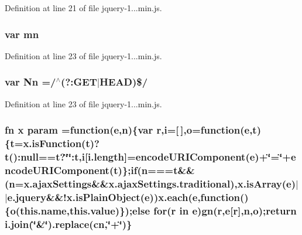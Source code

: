 Definition at line 21 of file jquery-\/1...\+min.\+js.

\hypertarget{_scripts_2jquery-1_810_82_8min_8js_a227fb8e4dbaed5a772526c7e9bb0795f}{}
\subsubsection[{mn}]{\setlength{\rightskip}{0pt plus 5cm}var mn}\label{_scripts_2jquery-1_810_82_8min_8js_a227fb8e4dbaed5a772526c7e9bb0795f}


Definition at line 23 of file jquery-\/1...\+min.\+js.

\hypertarget{_scripts_2jquery-1_810_82_8min_8js_a03586bb881647685652f72d98d189ed0}{}
\subsubsection[{Nn}]{\setlength{\rightskip}{0pt plus 5cm}var Nn =/$^\wedge$(?\+:G\+E\+T$\vert$H\+E\+A\+D)\$/}\label{_scripts_2jquery-1_810_82_8min_8js_a03586bb881647685652f72d98d189ed0}


Definition at line 23 of file jquery-\/1...\+min.\+js.

\hypertarget{_scripts_2jquery-1_810_82_8min_8js_ae8915303d11557d1b001bc56b6195251}{}
\subsubsection[{param}]{ {\bf fn} {\bf x} param =function({\bf e},n)\{var r,{\bf i}=\mbox{[}$\,$\mbox{]},{\bf o}=function({\bf e},{\bf t})\{{\bf t}=x.\+is\+Function({\bf t})?{\bf t}()\+:null=={\bf t}?\char`\"{}\char`\"{}\+:{\bf t},{\bf i}\mbox{[}i.\+length\mbox{]}=encode\+U\+R\+I\+Component({\bf e})+\char`\"{}=\char`\"{}+encode\+U\+R\+I\+Component({\bf t})\};{\bf if}(n==={\bf t}\&\&(n=x.\+ajax\+Settings\&\&x.\+ajax\+Settings.\+traditional),x.\+is\+Array({\bf e})$\vert$$\vert$e.\+jquery\&\&!x.\+is\+Plain\+Object({\bf e})){\bf x.\+each}({\bf e},function()\{{\bf o}(this.\+name,this.\+value)\});{\bf else} for(r in {\bf e}){\bf gn}(r,{\bf e}\mbox{[}r\mbox{]},n,{\bf o});return i.\+join(\char`\"{}\&\char`\"{}).replace({\bf cn},\char`\"{}+\char`\"{})\}}\label{_scripts_2jquery-1_810_82_8min_8js_ae8915303d11557d1b001bc56b6195251}


